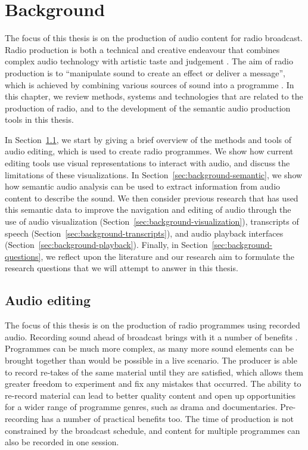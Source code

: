 
\chapter{Background}\label{sec:background}

The focus of this thesis is on the production of audio content for radio broadcast.  Radio production is both a
technical and creative endeavour that combines complex audio technology with artistic taste and judgement
\citep{Barbour2004}. The aim of radio production is to ``manipulate sound to create an effect or deliver a message'',
which is achieved by combining various sources of sound into a programme \citep[pp. 12, 20]{Hausman2012}.  In this
chapter, we review methods, systems and technologies that are related to the production of radio, and to the
development of the semantic audio production tools in this thesis.








In Section~\ref{sec:background-editing}, we start by giving a brief overview of the methods and tools of audio editing,
which is used to create radio programmes.  We show how current editing tools use visual representations to interact
with audio, and discuss the limitations of these visualizations.  In Section~\ref{sec:background-semantic}, we show how
semantic audio analysis can be used to extract information from audio content to describe the sound.  We then consider
previous research that has used this semantic data to improve the navigation and editing of audio through the use of
audio visualization (Section~\ref{sec:background-visualization}), transcripts of speech
(Section~\ref{sec:background-transcripts}), and audio playback interfaces (Section~\ref{sec:background-playback}).
Finally, in Section~\ref{sec:background-questions}, we reflect upon the literature and our research aim to formulate
the research questions that we will attempt to answer in this thesis.




\section{Audio editing}\label{sec:background-editing}


The focus of this thesis is on the production of radio programmes using recorded audio.  Recording
sound ahead of broadcast brings with it a number of benefits \citep[p. 133]{Hausman2012}.  Programmes can be much more
complex, as many more sound elements can be brought together than would be possible in a live scenario.  The producer
is able to record re-takes of the same material until they are satisfied, which allows them greater freedom to
experiment and fix any mistakes that occurred.  The ability to re-record material can lead to better quality content
and open up opportunities for a wider range of programme genres, such as drama and documentaries.  Pre-recording has a
number of practical benefits too.  The time of production is not constrained by the broadcast schedule,
and content for multiple programmes can also be recorded in one session.

